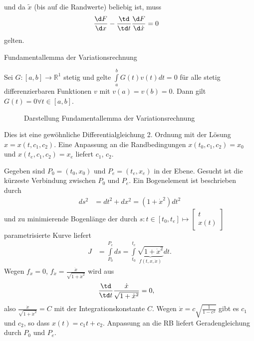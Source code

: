 und da $\tilde{x}$ (bis auf die Randwerte) beliebig ist, muss 
\begin{align}
	\frac{\d F}{\d x}-\frac{\td}{\td t}\frac{\d F}{\d\dot{x}} & = 0 \label{eqn:kap_2_euler_lag_dgl}
\end{align}
gelten.
\begin{remark}{Fundamentallemma der Variationsrechnung}

Sei $G:\left[a,b \right]\rightarrow\mathbb{R}^1$ stetig und gelte $\int\limits_a^b G(t)v(t)dt=0$ für alle stetig differenzierbaren Funktionen $v$ mit
$v(a)=v(b)=0$. Dann gilt $G(t)=0\forall t\in\left[a,b \right]$.
\begin{figure}[htb]
	\centering
	
	\caption{Darstellung Fundamentallemma der Variationsrechnung}
	\label{fig:kap_2_fundlemma_var}
\end{figure}
\end{remark}
Dies ist eine gewöhnliche Differentialgleichung 2. Ordnung mit der Lösung $x=x(t,c_1,c_2)$. Eine Anpassung an die Randbedingungen $x(t_0,c_1,c_2)=x_0$
und $x(t_e,c_1,c_2)=x_e$ liefert $c_1$, $c_2$.
\begin{exmp}
Gegeben sind $P_0=(t_0,x_0)$ und $P_e=(t_e,x_e)$ in der Ebene. Gesucht ist die kürzeste Verbindung zwischen $P_0$ und $P_e$. Ein Bogenelement ist
beschrieben durch 
\begin{align*}
	ds^2 & = dt^2 + dx^2 = \left(1+\dot{x}^2 \right)dt^2
\end{align*}
und zu minimierende Bogenlänge der durch $s:t\in\left[t_0,t_e \right]\mapsto \begin{bmatrix}
t\\ x(t)
\end{bmatrix}$ parametrisierte Kurve liefert
\begin{align*}
	J  & = \int\limits_{P_0}^{P_e}ds=\int\limits_{t_0}^{t_e}\underbrace{\sqrt{1+\dot{x}^2}}_{f(t,x,\dot{x})}dt.
\end{align*}
Wegen $f_x=0$, $f_{\dot{x}}=\frac{\dot{x}}{\sqrt{1+\dot{x}^2}}$ wird aus  
\begin{align*}
	\frac{\td}{\td t}\frac{\dot{x}}{\sqrt{1+\dot{x}^2}} & = 0,
\end{align*}
also $\frac{\dot{x}}{\sqrt{1+\dot{x}^2}}=C$ mit der Integrationskonstante $C$. Wegen $\dot{x}=c\sqrt{\frac{1}{1-c^2}}$ gibt es $c_1$ und $c_2$, so
dass $x(t)=c_1 t+c_2$. Anpassung an die \ac{RB} liefert Geradengleichung durch $P_0$ und $P_e$.
\end{exmp}
